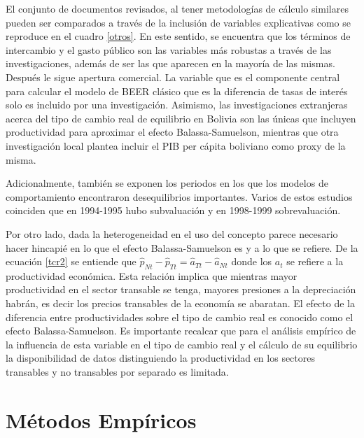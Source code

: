 \documentclass[12pt,letterpaper]{article}
\begin{document}

El conjunto de documentos revisados, al tener metodologías de cálculo similares pueden ser comparados a través de la inclusión de variables explicativas como se reproduce en el cuadro \ref{otros}. En este sentido, se encuentra que los términos de intercambio y el gasto público son las variables más robustas a través de las investigaciones, además de ser las que aparecen en la mayoría de las mismas. Después le sigue apertura comercial. La variable que es el componente central para calcular el modelo de BEER clásico que es la diferencia de tasas de interés solo es incluido por una investigación. Asimismo, las investigaciones extranjeras acerca del tipo de cambio real de equilibrio en Bolivia son las únicas que incluyen productividad para aproximar el efecto Balassa-Samuelson, mientras que otra investigación local plantea incluir el PIB per cápita boliviano como proxy de la misma.

Adicionalmente, también se exponen los periodos en los que los modelos de comportamiento encontraron desequilibrios importantes. Varios de estos estudios coinciden que en 1994-1995 hubo subvaluación y en 1998-1999 sobrevaluación. 

Por otro lado, dada la heterogeneidad en el uso del concepto parece necesario hacer hincapié en lo que el efecto Balassa-Samuelson es y a lo que se refiere. De la ecuación \ref{tcr2} se entiende que $\hat{p}_{Nt}-\hat{p}_{Tt}=\hat{a}_{Tt}-\hat{a}_{Nt}$ donde los $a_t$ se refiere a la productividad económica. Esta relación implica que mientras mayor productividad en el sector transable se tenga, mayores presiones a la depreciación habrán, es decir los precios transables de la economía se abaratan. El efecto de la diferencia entre productividades sobre el tipo de cambio real es conocido como el efecto Balassa-Samuelson. Es importante recalcar que para el análisis empírico de la influencia de esta variable en el tipo de cambio real y el cálculo de su equilibrio la disponibilidad de datos distinguiendo la productividad en los sectores transables y no transables por separado es limitada. 


\section{Métodos Empíricos}\label{tcr}
\end{document}
